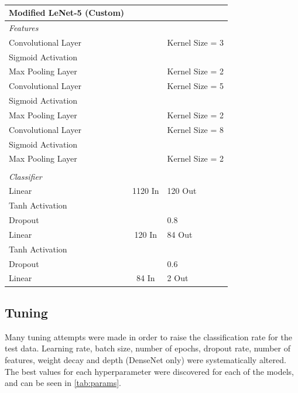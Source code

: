 \documentclass[manuscript,screen,review]{acmart}
\begin{document}
\begin{table}[h!]
\caption{}
  \label{tab:custom}
  \begin{tabular}{lcl}
    \textbf{Modified LeNet-5 (Custom)} \\
    \toprule
    \textit{Features} \\
    \midrule
    Convolutional Layer &  & Kernel Size = 3 \\
    Sigmoid Activation & & \\
    Max Pooling Layer & & Kernel Size = 2\\
    Convolutional Layer &  & Kernel Size = 5 \\
    Sigmoid Activation & & \\
    Max Pooling Layer & & Kernel Size = 2\\
    Convolutional Layer &  & Kernel Size = 8 \\
    Sigmoid Activation & & \\
    Max Pooling Layer & & Kernel Size = 2\\
     & & \\
    \textit{Classifier} \\
    \midrule
    Linear & 1120 In & 120 Out\\
    Tanh Activation & & \\
    Dropout & & 0.8 \\
    Linear & 120 In & 84 Out\\
    Tanh Activation & & \\
    Dropout & & 0.6 \\
    Linear & 84 In & 2 Out\\
  \bottomrule
\end{tabular}
\end{table}


\subsection{Tuning}

Many tuning attempts were made in order to raise the classification rate for the test data. Learning rate, batch size, number of epochs, dropout rate, number of features, weight decay and depth (DenseNet only) were systematically altered. The best values for each hyperparameter were discovered for each of the models, and can be seen in \cref{tab:params}.
\end{document}
